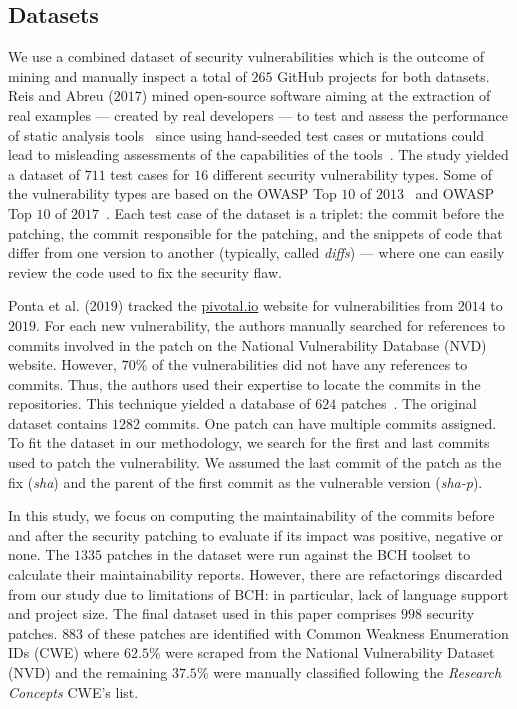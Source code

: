 \documentclass[10pt,conference]{IEEEtran}
\begin{document}
\subsection{Datasets}
%
We use a combined dataset of security vulnerabilities which is 
the outcome of mining and manually inspect a total of $265$ GitHub projects for both
datasets. Reis and Abreu 
($2017$) mined open-source
software aiming at the extraction of real examples --- created by real
developers --- to test and assess the performance of static analysis tools~\cite{Reis:2017:IJSSE} since
using hand-seeded test cases or mutations could lead to misleading assessments
of the capabilities of the tools~\cite{just2014mutants}. The study yielded a
dataset of $711$ test cases for $16$ different security vulnerability types. Some of the vulnerability types
are based on the OWASP Top $10$ of $2013$~\cite{oswap:2013} and OWASP Top $10$ of
$2017$~\cite{oswap:2017}. Each test case of the
dataset is a triplet: the commit before the patching, the commit responsible
for the patching, and the snippets of code that differ from one version to
another (typically, called \textit{diffs}) --- where one can easily review the
code used to fix the security flaw. 
%

Ponta et al. ($2019$) tracked the \url{pivotal.io} website for vulnerabilities 
from $2014$ to $2019$. For each new vulnerability, the authors manually searched 
for references to commits involved in the patch on the National Vulnerability 
Database (NVD) website. However, $70\%$
of the vulnerabilities did not have any references to commits. Thus, the authors
used their expertise to locate the commits in the repositories. This technique 
yielded a database of $624$ patches~\cite{10.1109/MSR.2019.00064}. The original 
dataset contains $1282$ commits. One patch can have multiple commits assigned.
To fit the dataset in our methodology, we search for the first and last commits
used to patch the vulnerability. We assumed the last commit of the patch as 
the fix (\emph{sha}) and the parent of the first commit as the vulnerable version 
(\emph{sha-p}).
%

In this study, we focus on computing the
maintainability of the commits before and after the security patching to
evaluate if its impact was positive, negative or none.
The $1335$ patches in the dataset were run against the BCH toolset to
calculate their maintainability reports. However, there are refactorings
discarded from our study due to limitations of BCH: in particular, lack of
language support and project size. The final dataset used in this paper comprises
$998$ security patches. $883$ of these patches are identified with Common Weakness
Enumeration IDs (CWE) where $62.5\%$ were scraped from the National Vulnerability 
Dataset (NVD) and the remaining $37.5\%$ were manually classified following the 
\emph{Research Concepts} CWE's list.
\end{document}

